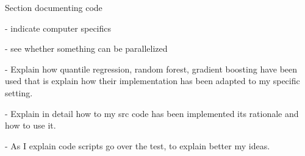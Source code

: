 Section documenting code

- indicate computer specifics

- see whether something can be parallelized

- Explain how quantile regression,
random forest, gradient boosting have been used
that is explain how their implementation has been
adapted to my specific setting.

- Explain in detail how to my src code has been implemented
its rationale and how to use it.

- As I explain code scripts go over the test, to 
explain better my ideas.